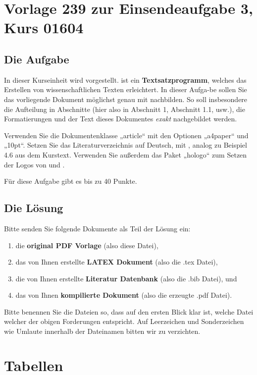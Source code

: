 \documentclass[a4paper,10pt]{article}
\begin{document}
\section{Vorlage 239 zur Einsendeaufgabe 3, Kurs 01604}


\subsection{Die Aufgabe}
In dieser Kurseinheit wird  vorgestellt.  ist ein \textbf{Textsatzprogramm}, welches das Erstellen von wissenschaftlichen Texten erleichtert. In dieser Aufga-be sollen Sie das vorliegende Dokument möglichst genau mit  nachbilden. So soll insbesondere die Aufteilung in Abschnitte (hier also in Abschnitt 1, Abschnitt 1.1, usw.), die Formatierungen und der Text dieses Dokumentes \textit{exakt} nachgebildet werden.%


Verwenden Sie die Dokumentenklasse „article“ mit den Optionen „a4paper“ und „10pt“. Setzen Sie das Literaturverzeichnis auf Deutsch, mit , analog zu Beispiel 4.6 aus dem Kurstext. Verwenden Sie außerdem das Paket „hologo“ zum Setzen der Logos von  und .%

Für diese Aufgabe gibt es bis zu 40 Punkte.


\subsection {Die Lösung}
Bitte senden Sie folgende Dokumente als Teil der Lösung ein:
\begin{enumerate}
\item die \textbf{original PDF Vorlage} (also diese Datei),
\item das von Ihnen erstellte \textbf{LATEX Dokument} (also die .tex Datei),
\item die von Ihnen erstellte \textbf{Literatur Datenbank} (also die .bib Datei), und
\item  das von Ihnen \textbf{kompilierte Dokument} (also die erzeugte .pdf Datei).
\end{enumerate}
Bitte benennen Sie die Dateien so, dass auf den ersten Blick klar ist, welche Datei welcher der obigen Forderungen entspricht. Auf Leerzeichen und Sonderzeichen wie Umlaute innerhalb der Dateinamen bitten wir zu verzichten.

\section {Tabellen}
\end{document}
